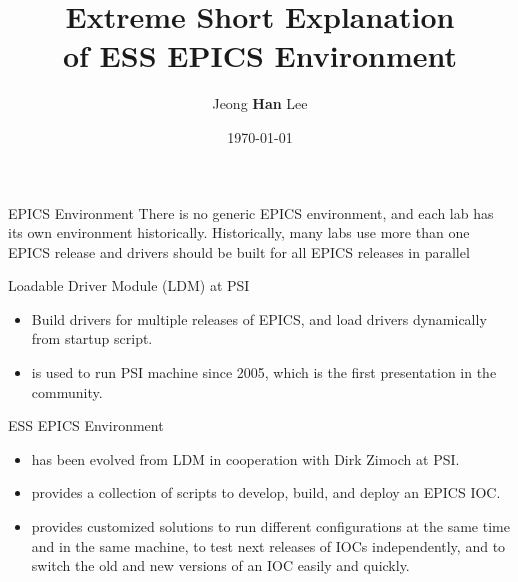 \documentclass[
  8pt
  , table
  , ignorenonframetext
]{beamer}
\title{Extreme Short Explanation \\ of ESS EPICS Environment}
\author{Jeong \textbf{Han} Lee}%
\institute{
  han.lee@esss.se\\
  Integrated Control System Division\\
  \textbf{ESS}, Sweden
}
\date{\today}%
\begin{document}
 
\begin{frame}[plain]
 \titlepage
\end{frame}


\begin{frame}{EPICS Environment}
  There is no generic EPICS environment, and each lab has its own environment historically. Historically, many labs use more than one EPICS release and drivers should be built for all EPICS releases in parallel
  \begin{block}{Loadable Driver Module (LDM) at PSI}
    \begin{itemize}
    \item Build drivers for multiple releases of EPICS, and load drivers dynamically from startup script.
    \item is used to run PSI machine since 2005, which is the first presentation in the community.
    \end{itemize}
  \end{block}

  \begin{exampleblock}{ESS EPICS Environment}
    \begin{itemize}
    \item has been evolved from LDM in cooperation with Dirk Zimoch at PSI.
    \item provides a collection of scripts to develop, build, and deploy an EPICS IOC.
    \item provides customized solutions to run different configurations at the same time and in the same machine, to test next releases of IOCs independently, and to switch the old and new versions of an IOC easily and quickly.
    \end{itemize}
  \end{exampleblock}
\end{frame}
\end{document}
